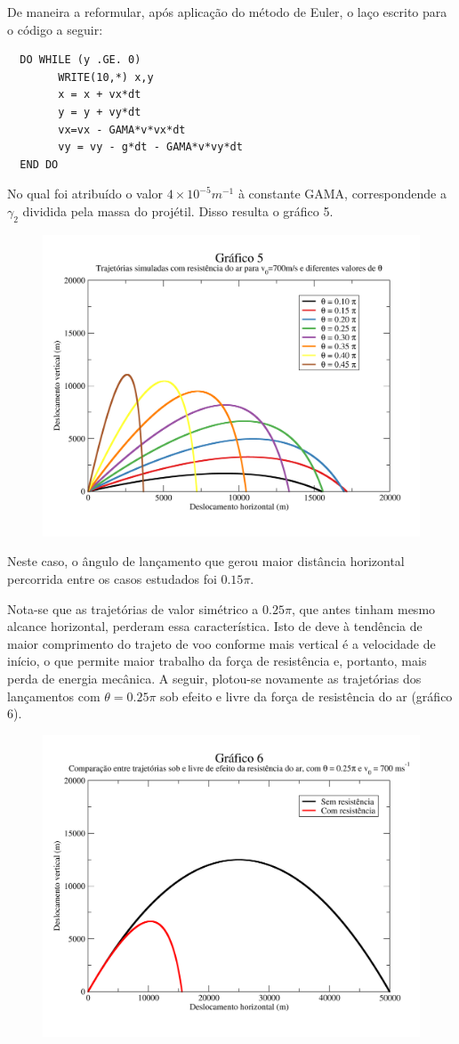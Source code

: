 \documentclass{article}
\begin{document}
De maneira a reformular, após aplicação do método de Euler, o laço escrito para o código a seguir:

\begin{lstlisting}
  DO WHILE (y .GE. 0)
        WRITE(10,*) x,y
        x = x + vx*dt
        y = y + vy*dt
        vx=vx - GAMA*v*vx*dt
        vy = vy - g*dt - GAMA*v*vy*dt
  END DO
\end{lstlisting}

No qual foi atribuído o valor $4\times 10^{-5}m^{-1}$ à constante GAMA, correspondende a $\gamma_2$ dividida pela massa do projétil. Disso resulta o gráfico 5.

\begin{figure}[h!]
  \centering
  \includegraphics[width=.64\textwidth]{graf5}
\end{figure}

\par Neste caso, o ângulo de lançamento que gerou maior distância horizontal percorrida entre os casos estudados foi $0.15 \pi$.\par
Nota-se que as trajetórias de valor simétrico a $0.25 \pi$, que antes tinham mesmo alcance horizontal, perderam essa característica. Isto de deve à tendência de maior comprimento do trajeto de voo conforme mais vertical é a velocidade de início, o que permite maior trabalho da força de resistência e, portanto, mais perda de energia mecânica.
A seguir, plotou-se novamente as trajetórias dos lançamentos com $\theta=0.25\pi$ sob efeito e livre da força de resistência do ar (gráfico 6).

\begin{figure}[h!]
  \centering
  \includegraphics[width=.64\textwidth]{graf6.png}
\end{figure}
\end{document}
